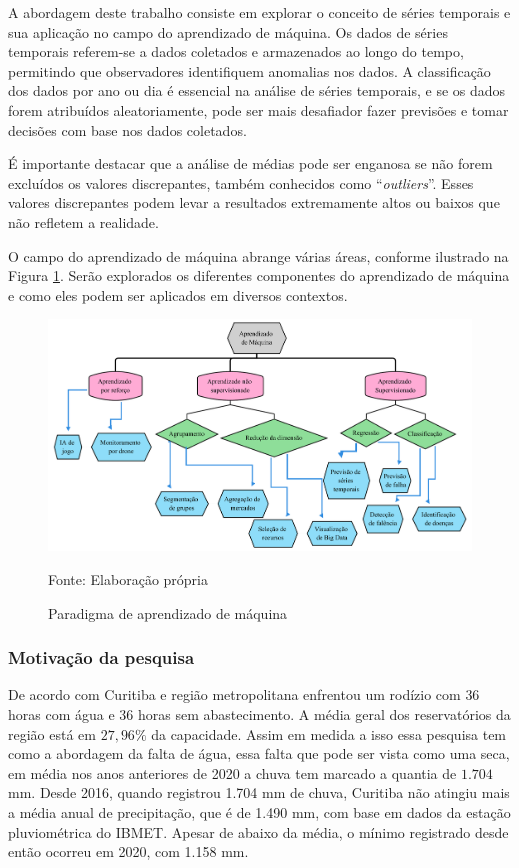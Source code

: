 A abordagem deste trabalho consiste em explorar o conceito de séries temporais e sua aplicação no campo do aprendizado de máquina. Os dados de séries temporais referem-se a dados coletados e armazenados ao longo do tempo, permitindo que observadores identifiquem anomalias nos dados. A classificação dos dados por ano ou dia é essencial na análise de séries temporais, e se os dados forem atribuídos aleatoriamente, pode ser mais desafiador fazer previsões e tomar decisões com base nos dados coletados.

É importante destacar que a análise de médias pode ser enganosa se não forem excluídos os valores discrepantes, também conhecidos como ``\textit{outliers}''. Esses valores discrepantes podem levar a resultados extremamente altos ou baixos que não refletem a realidade.

O campo do aprendizado de máquina abrange várias áreas, conforme ilustrado na Figura \ref{fig:paradigma-ml}. Serão explorados os diferentes componentes do aprendizado de máquina e como eles podem ser aplicados em diversos contextos.
 
\begin{figure}[H]
	\centering
	\caption{Paradigma de aprendizado de máquina}
	\includegraphics[width=1\linewidth]{Introducao/Figuras/paradigma-ml}
	
	Fonte: Elaboração própria
	\label{fig:paradigma-ml}
\end{figure}
  
      
\subsubsection{Motiva\c c\~ao da pesquisa} \label{subsubsec:motivacao}
    
    De acordo com \cite{vasconcelos_2020} Curitiba e região metropolitana enfrentou um rodízio com $36$ horas com água e $36$ horas sem abastecimento. A média geral dos reservatórios da região está em $27,96\%$ da capacidade. Assim em medida a isso essa pesquisa tem como a abordagem da falta de água, essa falta que pode ser vista como uma seca, em média nos anos anteriores de 2020 a chuva tem marcado a quantia de $1.704$ mm. \cite{vasconcelos_2020} Desde 2016, quando registrou 1.704 mm de chuva, Curitiba não atingiu mais a média anual de precipitação, que é de 1.490 mm, com base em dados da estação pluviométrica do IBMET.  Apesar de abaixo da média, o mínimo registrado desde então ocorreu em 2020, com 1.158 mm.
    
